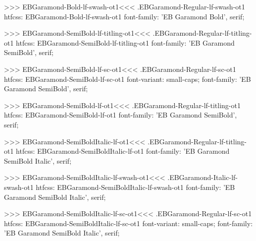 {{{{{{{>>>
\<EBGaramond-Bold-lf-swash-ot1\><<<
.EBGaramond-Regular-lf-swash-ot1
htfcss:  EBGaramond-Bold-lf-swash-ot1  font-family: 'EB Garamond Bold', serif;

>>>
\<EBGaramond-SemiBold-lf-titling-ot1\><<<
.EBGaramond-Regular-lf-titling-ot1
htfcss:  EBGaramond-SemiBold-lf-titling-ot1  font-family: 'EB Garamond SemiBold', serif;

>>>
\<EBGaramond-SemiBold-lf-sc-ot1\><<<
.EBGaramond-Regular-lf-sc-ot1
htfcss:  EBGaramond-SemiBold-lf-sc-ot1  font-variant: small-caps; font-family: 'EB Garamond SemiBold', serif;

>>>
\<EBGaramond-SemiBold-lf-ot1\><<<
.EBGaramond-Regular-lf-titling-ot1
htfcss:  EBGaramond-SemiBold-lf-ot1  font-family: 'EB Garamond SemiBold', serif;

>>>
\<EBGaramond-SemiBoldItalic-lf-ot1\><<<
.EBGaramond-Regular-lf-titling-ot1
htfcss:  EBGaramond-SemiBoldItalic-lf-ot1  font-family: 'EB Garamond SemiBold Italic', serif;

>>>
\<EBGaramond-SemiBoldItalic-lf-swash-ot1\><<<
.EBGaramond-Italic-lf-swash-ot1
htfcss:  EBGaramond-SemiBoldItalic-lf-swash-ot1  font-family: 'EB Garamond SemiBold Italic', serif;

>>>
\<EBGaramond-SemiBoldItalic-lf-sc-ot1\><<<
.EBGaramond-Regular-lf-sc-ot1
htfcss:  EBGaramond-SemiBoldItalic-lf-sc-ot1  font-variant: small-caps; font-family: 'EB Garamond SemiBold Italic', serif;

}}}}}}}

